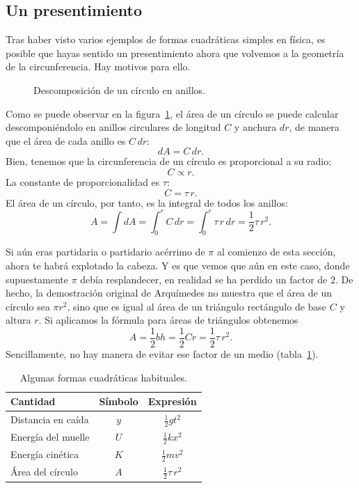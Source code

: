   \subsection{Un presentimiento} %
  \label{sec:a_sense_of_foreboding}

Tras haber visto varios ejemplos de formas cuadráticas simples en física, es posible que hayas sentido un presentimiento ahora que volvemos a la geometría de la circunferencia. Hay motivos para ello.

\begin{figure}
\begin{center}
\end{center}
\caption{Descomposición de un círculo en anillos.\label{fig:circular_area}}
\end{figure}

Como se puede observar en la figura~\ref{fig:circular_area}, el área de un círculo se puede calcular descomponiéndolo en anillos circulares de longitud $C$ y anchura $dr$, de manera que el área de cada anillo es $C\,dr$:
\[ dA = C\,dr. \]
Bien, tenemos que la circunferencia de un círculo es proporcional a su radio:
\[ C \propto r. \]
La constante de proporcionalidad es $\tau$:
\[ C = \tau\,r. \]
El área de un círculo, por tanto, es la integral de todos los anillos:
\[ A = \int dA = \int_0^r C\,dr = \int_0^r \tau\,r\,dr = \textstyle{\frac{1}{2}} \tau\,r^2. \]

Si aún eras partidaria o partidario acérrimo de  $\pi$ al comienzo de esta sección, ahora te habrá explotado la cabeza. Y es que vemos que aún en este caso, donde supuestamente $\pi$ debía resplandecer, en realidad se ha perdido un factor de $2$. De hecho, la demostración original de Arquímedes no muestra que el área de un círculo sea $\pi r^2$, sino que es igual al área de un triángulo rectángulo de base $C$ y altura $r$. Si aplicamos la fórmula para áreas de triángulos obtenemos
\[
  A = \textstyle{\frac{1}{2}} bh = \textstyle{\frac{1}{2}}Cr = \textstyle{\frac{1}{2}}\tau\,r^2.
\]
Sencillamente, no hay manera de evitar ese factor de un medio (tabla~\ref{table:quadratic_forms}).

\begin{table}
\begin{center}
\begin{tabular}{lcc}
Cantidad & Símbolo & Expresión \\ \hline
Distancia en caída & $y$ & $\textstyle{\frac{1}{2}}gt^2$ \smallskip \\
Energía del muelle & $U$ & $\textstyle{\frac{1}{2}}kx^2$ \smallskip \\
Energía cinética & $K$ & $\textstyle{\frac{1}{2}}mv^2$ \smallskip \\
Área del círculo & $A$ & $\textstyle{\frac{1}{2}}\tau\,r^2$
\end{tabular}
\end{center}
\caption{Algunas formas cuadráticas habituales.\label{table:quadratic_forms}}
\end{table}

